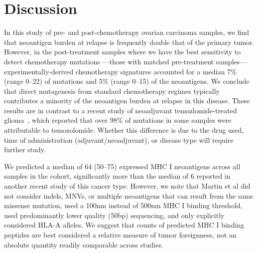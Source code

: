 \section*{Discussion}

In this study of pre- and post-chemotherapy ovarian carcinoma samples, we find that neoantigen burden at relapse is frequently double that of the primary tumor. However, in the post-treatment samples where we have the best sensitivity to detect chemotherapy mutations ---those with matched pre-treatment samples--- experimentally-derived chemotherapy signatures accounted for a median 7\% (range 0--22) of mutations and 5\% (range 0--15) of the neoantigens. We conclude that direct mutagenesis from standard chemotherapy regimes typically contributes a minority of the neoantigen burden at relapse in this disease. These results are in contrast to a recent study of neoadjuvant temozlomide-treated glioma~\cite{Johnson_2013}, which reported that over 98\% of mutations in some samples were attributable to temozolomide. Whether this difference is due to the drug used, time of administration (adjuvant/neoadjuvant), or disease type will require further study.




We predicted a median of 64 (50--75) expressed MHC I neoantigens across all samples in the cohort, significantly more than the median of 6 reported in another recent study of this cancer type\cite{Martin_2016}. However, we note that Martin et al did not consider indels, MNVs, or multiple neoantigens that can result from the same missense mutation, used a 100nm instead of 500nm MHC I binding threshold, used predominantly lower quality (50bp) sequencing, and only explicitly considered HLA-A alleles. We suggest that counts of predicted MHC I binding peptides are best considered a relative measure of tumor foreignness, not an absolute quantity readily comparable across studies.


